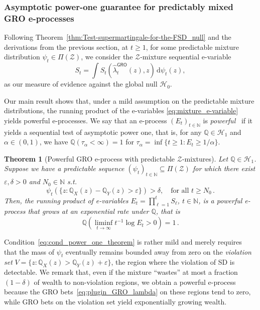 \documentclass[12pt,twoside]{article}
\theoremstyle{plain}
\newtheorem{theorem}{Theorem}
\theoremstyle{definition}
\theoremstyle{remark}
\newcommand{\inparen}[1]{\left(#1\right)}
\newcommand{\N}{\mathbb{N}}
\newcommand{\Q}{\mathbb{Q}}
\newcommand{\calH}{\mathcal{H}}
\newcommand{\calZ}{\mathcal{Z}}
\newcommand{\Qsymb}{\mathbb{Q}}
\newcommand{\diff}{\,\mathrm{d}}
\renewcommand{\epsilon}{\varepsilon}
\begin{document}
\subsubsection{Asymptotic power-one guarantee for predictably mixed GRO e-processes}\label{sec:power_one_theorem}

Following Theorem~\ref{thm:Test-supermartingale-for-the-FSD_null} and the derivations from the previous section, at $t\geq 1$, for some predictable mixture distribution $\psi_t \in \Pi(\calZ)$, we consider the $\calZ$-mixture sequential e-variable
\begin{equation}\label{eq:mixture_e-variable}
    S_t = \int S_t(\hat{\lambda}_t^\textsf{GRO}(z),z)\diff\psi_t( z), 
\end{equation}
as our measure of evidence against the global null $\calH_0$. 

Our main result shows that, under a mild assumption on the predictable mixture distributions, the running product of the e-variables \eqref{eq:mixture_e-variable} yields powerful e-processes.  
We say that an e-process $(E_t)_{t\in\N}$ is \emph{powerful}~\citep{ramdas2021testing} if it yields a sequential test of asymptotic power one, that is, for any $\mathbb{Q}\in\calH_1$ and $\alpha\in(0,1)$, we have $\Q(\tau_\alpha<\infty)= 1$ for $\tau_\alpha=\inf\{t\geq 1: E_t \geq 1/\alpha\}$. 

\begin{theorem}[Powerful GRO e-process with predictable $\calZ$-mixtures]\label{thm:asymptotic_power_one} 
Let $\Qsymb\in \calH_1$. 
Suppose we have a predictable sequence $(\psi_t)_{t\in \N}\subseteq \Pi(\calZ)$ for which there exist $\epsilon,\delta>0$ and $N_0 \in \N$ s.t.
\begin{equation}\label{eq:cond_power_one_theorem}
\psi_t(\{z:\Qsymb_X(z) -\Qsymb_Y(z)> \epsilon\})>\delta, \quad \textrm{for all }t\geq N_0\,.
\end{equation}
Then, the running product of e-variables $E_t=\prod_{\ell=1}^t S_\ell$, $t\in \N$, is a powerful e-process that grows at an exponential rate under $\Qsymb$, that is
\begin{equation*}
\Qsymb\inparen{\liminf_{t\to\infty}t^{-1}\log E_t >0} = 1\,.
\end{equation*}
\end{theorem}

Condition~\eqref{eq:cond_power_one_theorem} is rather mild and merely requires that the mass of $\psi_t$ eventually remains bounded away from zero on the \emph{violation set} $V=\{z : \Qsymb_X(z) > \Qsymb_Y(z)+\epsilon\}$, the region where the violation of SD is detectable. 
We remark that, even if the mixture ``wastes'' at most a fraction $(1-\delta)$ of wealth to non-violation regions, we obtain a powerful e-process because the GRO bets~\eqref{eq:plugin_GRO_lambda} on these regions tend to zero, while GRO bets on the violation set yield exponentially growing wealth. 
\end{document}
